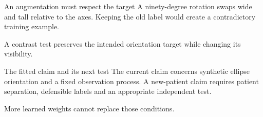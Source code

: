 \documentclass[aspectratio=169,11pt]{beamer}
\newcommand{\notestarget}{notes.pdf}\newcommand{\noteslabel}{Notes}
\begin{document}
\renewcommand{\notestarget}{notes.pdf\#note-contrast-target-transformations-and-a-defensible-conclusion}
\begin{frame}[t,fragile,label=slide-an-augmentation-must-respect-the-target]{An augmentation must respect the target}
A ninety-degree rotation swaps wide and tall relative to the axes.
\pause{}
Keeping the old label would create a contradictory training example.

A contrast test preserves the intended orientation target while changing its visibility.
\end{frame}
\renewcommand{\notestarget}{notes.pdf\#note-contrast-target-transformations-and-a-defensible-conclusion}
\begin{frame}[t,fragile,label=slide-the-fitted-claim-and-its-next-test]{The fitted claim and its next test}
The current claim concerns synthetic ellipse orientation and a fixed observation process.
\pause{}
A new-patient claim requires patient separation, defensible labels and an appropriate independent test.

More learned weights cannot replace those conditions.
\end{frame}
\end{document}
